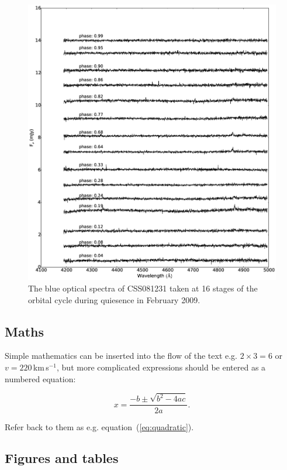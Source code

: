 \documentclass[a4paper,fleqn,usenatbib]{mnras}
\begin{document}
\begin{figure}
\centering
\includegraphics[width=\textwidth]{images/blue_spectra.eps}
\caption[Caption for spectra]{The blue optical spectra of CSS081231 taken at 16 stages of the orbital cycle during quiesence in February 2009.  }
\label{fig:spectra-quiescent}
\end{figure}

\subsection{Maths}
\label{sec:maths} %

Simple mathematics can be inserted into the flow of the text e.g. $2\times3=6$
or $v=220$\,km\,s$^{-1}$, but more complicated expressions should be entered
as a numbered equation:

\begin{equation}
    x=\frac{-b\pm\sqrt{b^2-4ac}}{2a}.
	\label{eq:quadratic}
\end{equation}

Refer back to them as e.g. equation~(\ref{eq:quadratic}).

\subsection{Figures and tables}
\end{document}
